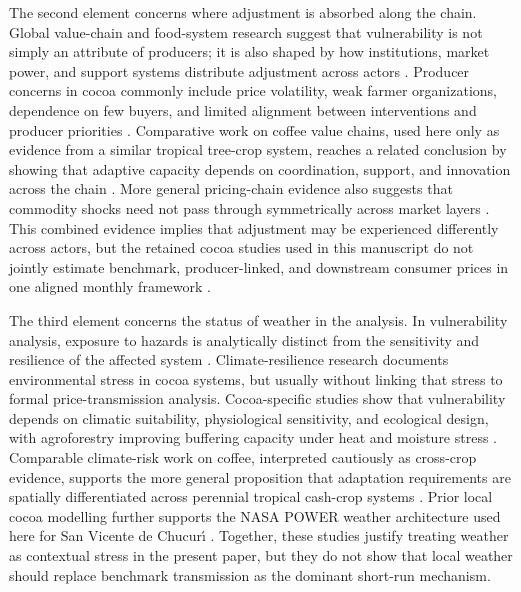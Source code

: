 \documentclass[11pt]{article}
\begin{document}
The second element concerns where adjustment is absorbed along the chain. Global value-chain and food-system research suggest that vulnerability is not simply an attribute of producers; it is also shaped by how institutions, market power, and support systems distribute adjustment across actors \citep{Gereffi2005,Merkle2021}. Producer concerns in cocoa commonly include price volatility, weak farmer organizations, dependence on few buyers, and limited alignment between interventions and producer priorities \citep{Mithofer2017}. Comparative work on coffee value chains, used here only as evidence from a similar tropical tree-crop system, reaches a related conclusion by showing that adaptive capacity depends on coordination, support, and innovation across the chain \citep{Morales2022,Verburg2019}. More general pricing-chain evidence also suggests that commodity shocks need not pass through symmetrically across market layers \citep{MeyerCramon2004,JimenezRodriguez2022}. This combined evidence implies that adjustment may be experienced differently across actors, but the retained cocoa studies used in this manuscript do not jointly estimate benchmark, producer-linked, and downstream consumer prices in one aligned monthly framework \citep{Poku2017,acosta_ihle_voncramon_2019}. %

The third element concerns the status of weather in the analysis. In vulnerability analysis, exposure to hazards is analytically distinct from the sensitivity and resilience of the affected system \citep{Turner2003,gatto2021}. Climate-resilience research documents environmental stress in cocoa systems, but usually without linking that stress to formal price-transmission analysis. Cocoa-specific studies show that vulnerability depends on climatic suitability, physiological sensitivity, and ecological design, with agroforestry improving buffering capacity under heat and moisture stress \citep{Schroth2016,Vaast2014,AkrofiAtitianti2018}. Comparable climate-risk work on coffee, interpreted cautiously as cross-crop evidence, supports the more general proposition that adaptation requirements are spatially differentiated across perennial tropical cash-crop systems \citep{Koh2020,Laderach2016}. Prior local cocoa modelling further supports the NASA POWER weather architecture used here for San Vicente de Chucur\'{\i} \citep{talero_sarmiento_etal_2025}. Together, these studies justify treating weather as contextual stress in the present paper, but they do not show that local weather should replace benchmark transmission as the dominant short-run mechanism.
\end{document}
